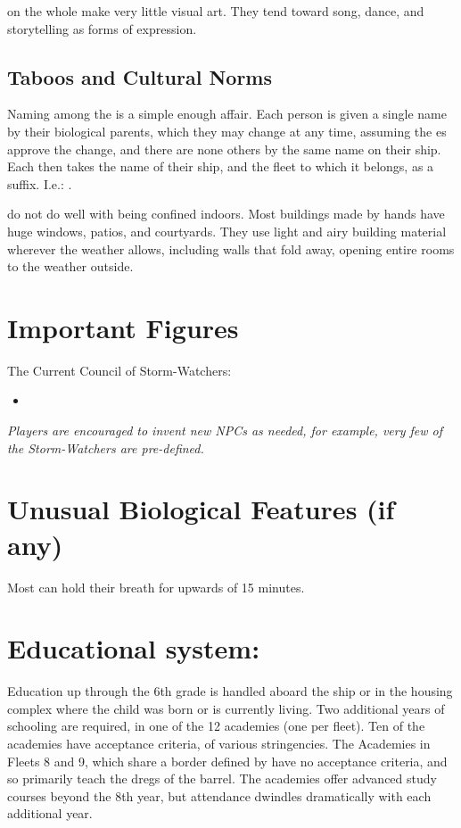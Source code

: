 \documentclass[blue]{GL2020}
\begin{document}
\pShippies{} on the whole make very little visual art. They tend toward song, dance, and storytelling as forms of expression.

\subsection*{Taboos and Cultural Norms}
Naming among the \pShip{} is a simple enough affair. Each person is given a single name by their biological parents, which they may change at any time, assuming the \cEbb{\God}es approve the change, and there are none others by the same name on their ship. Each \pShippies{} then takes the name of their ship, and the fleet to which it belongs, as a suffix. I.e.: \cLoud{\full}.

\pShippies{} do not do well with being confined indoors. Most buildings made by \pShip{} hands have huge windows, patios, and courtyards. They use light and airy building material wherever the weather allows, including walls that fold away, opening entire rooms to the weather outside.

\section*{Important Figures}
The Current Council of Storm-Watchers:
\begin{itemize}
	\item \cLoud{}
\end{itemize}

\emph{Players are encouraged to invent new NPCs as needed, for example, very few of the Storm-Watchers are pre-defined.}

\section*{Unusual Biological Features (if any)}
Most \pShippies{} can hold their breath for upwards of 15 minutes.

\section{Educational system:}
Education up through the 6th grade is handled aboard the ship or in the housing complex where the child was born or is currently living. Two additional years of schooling are required, in one of the 12 academies (one per fleet). Ten of the academies have acceptance criteria, of various stringencies. The Academies in Fleets 8 and 9, which share a border defined by \pWoD{} have no acceptance criteria, and so primarily teach the dregs of the barrel. The academies offer advanced study courses beyond the 8th year, but attendance dwindles dramatically with each additional year.
\end{document}
